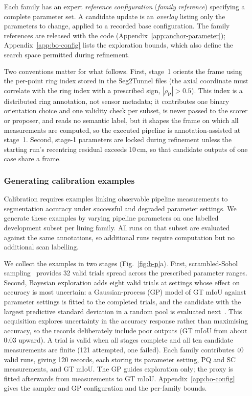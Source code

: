 \documentclass[a4paper,fleqn]{cas-dc}
\begin{document}
Each family has an expert \emph{reference configuration} (\emph{family reference}) specifying a complete parameter set. A candidate update is an \emph{overlay} listing only the parameters to change, applied to a recorded base configuration. The family references are released with the code (Appendix~\ref{app:anchor-parameter}); Appendix~\ref{app:bo-config} lists the exploration bounds, which also define the search space permitted during refinement.

Two conventions matter for what follows. First, stage~1 orients the frame using the per-point ring index stored in the Seg2Tunnel files (the axial coordinate must correlate with the ring index with a prescribed sign, $|\rho_{\mathrm P}|>0.5$). This index is a distributed ring annotation, not sensor metadata; it contributes one binary orientation choice and one validity check per subset, is never passed to the scorer or proposer, and reads no semantic label, but it shapes the frame on which all measurements are computed, so the executed pipeline is annotation-assisted at stage~1. Second, stage-1 parameters are locked during refinement unless the starting run's recentring residual exceeds 10\,cm, so that candidate outputs of one case share a frame.

\subsubsection{Generating calibration examples}
\label{sec:bo-experience}

Calibration requires examples linking observable pipeline measurements to segmentation accuracy under successful and degraded parameter settings. We generate these examples by varying pipeline parameters on one labelled development subset per lining family. All runs on that subset are evaluated against the same annotations, so additional runs require computation but no additional scan labelling.

We collect the examples in two stages (Fig.~\ref{fig:b-p}a). First, scrambled-Sobol sampling~\cite{joe2008constructing} provides 32 valid trials spread across the prescribed parameter ranges. Second, Bayesian exploration adds eight valid trials at settings whose effect on accuracy is most uncertain: a Gaussian-process (GP) model of GT mIoU against parameter settings is fitted to the completed trials, and the candidate with the largest predictive standard deviation in a random pool is evaluated next~\cite{gramacy2009adaptive,gramacy2020surrogates}. This acquisition explores uncertainty in the accuracy response rather than maximising accuracy, so the records deliberately include poor outputs (GT mIoU from about 0.03 upward). A trial is valid when all stages complete and all ten candidate measurements are finite (121 attempted, one failed). Each family contributes 40 valid runs, giving 120 records, each storing its parameter setting, PQ and SC measurements, and GT mIoU. The GP guides exploration only; the proxy is fitted afterwards from measurements to GT mIoU. Appendix~\ref{app:bo-config} gives the sampler and GP configuration and the per-family bounds.
\end{document}
